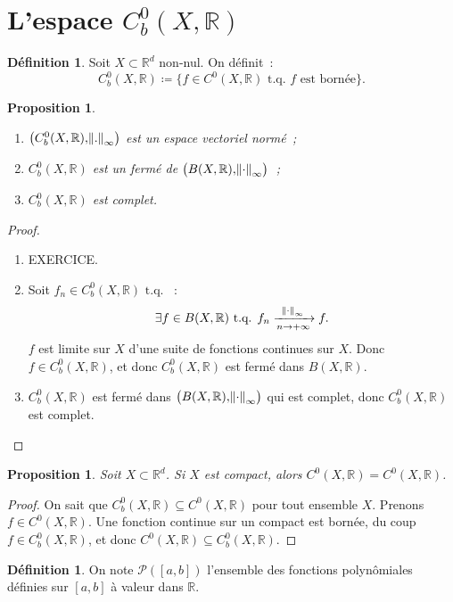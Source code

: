 \documentclass{report}
\newtheorem{prp}[thm]{Proposition}
\theoremstyle{definition}
\newtheorem{déf}[thm]{Définition}
\theoremstyle{remark}
\newcommand{\R}{\mathbb R}
\newcommand{\tq}{\text{ t.q. }}
\newcommand{\pinfty}{{+\infty}}
\newcommand{\evn}{espace vectoriel normé}
\begin{document}
	\section{L'espace $C_b^0(X, \R)$}
		\begin{déf} Soit $X \subset \R^d$ non-nul. On définit~:
		\[C^0_b(X, \R) \coloneqq \{f \in C^0(X, \R) \tq f \text{ est bornée}\}.\]
		\end{déf}

		\begin{prp}~
		\begin{enumerate}
			\item $\left(C^0_b(X, \R), \norm ._\infty\right)$ est un \evn~;
			\item $C^0_b(X, \R)$ est un fermé de $\left(B(X, \R), \norm \cdot_\infty\right)$~;
			\item $C^0_b(X, \R)$ est complet.
		\end{enumerate}
		\end{prp}

		\begin{proof}~
		\begin{enumerate}
			\item EXERCICE.
			\item Soit $f_n \in C^0_b(X, \R) \tq$~:
			\[\exists f \in B(X, \R) \tq f_n \xrightarrow[n \to \pinfty]{\norm \cdot_\infty} f.\]
			$f$ est limite sur $X$ d'une suite de fonctions continues sur $X$. Donc $f \in C^0_b(X, \R)$, et donc $C^0_b(X, \R)$ est fermé dans $B(X, \R)$.
			\item $C^0_b(X, \R)$ est fermé dans $\left(B(X, \R), \norm \cdot_\infty\right)$ qui est complet, donc $C^0_b(X, \R)$ est complet.
		\end{enumerate}
		\end{proof}

		\begin{prp} Soit $X \subset \R^d$. Si $X$ est compact, alors $C^0(X, \R) = C^0(X, \R)$.
		\end{prp}

		\begin{proof} On sait que $C^0_b(X, \R) \subseteq C^0(X, \R)$ pour tout ensemble $X$. Prenons $f \in C^0(X, \R)$. Une fonction continue sur un compact
		est bornée, du coup $f \in C^0_b(X, \R)$, et donc $C^0(X, \R) \subseteq C^0_b(X, \R)$.
		\end{proof}

		\begin{déf} On note $\mathcal P([a, b])$ l'ensemble des fonctions polynômiales définies sur $[a, b]$ à valeur dans $\R$.
		\end{déf}
\end{document}
